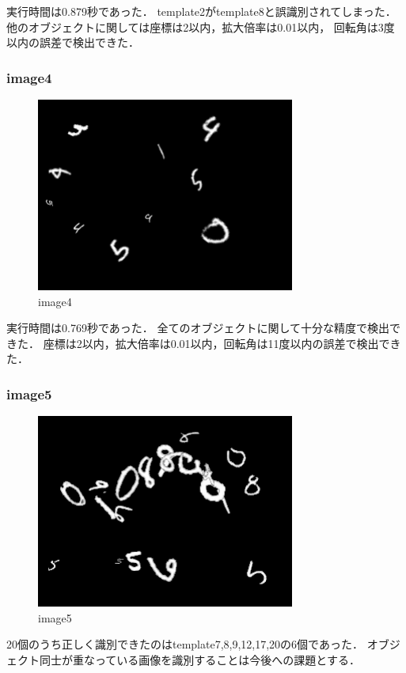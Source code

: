 \documentclass[uplatex,dvipdfmx]{jsarticle}
\begin{document}

\newpage
実行時間は0.879秒であった．
template2がtemplate8と誤識別されてしまった．
他のオブジェクトに関しては座標は2以内，拡大倍率は0.01以内，
回転角は3度以内の誤差で検出できた．


\subsubsection{image4}

\begin{figure}[h]
\centering
\includegraphics[clip,width = 8.5cm]{images/image4.png}
\caption{image4}
\label{graph4}
\end{figure}


\newpage
実行時間は0.769秒であった．
全てのオブジェクトに関して十分な精度で検出できた．
座標は2以内，拡大倍率は0.01以内，回転角は11度以内の誤差で検出できた．


\subsubsection{image5}
\begin{figure}[h]
\centering
\includegraphics[clip,width = 8.5cm]{images/image5.png}
\caption{image5}
\label{graph5}
\end{figure}
20個のうち正しく識別できたのはtemplate7,8,9,12,17,20の6個であった．
オブジェクト同士が重なっている画像を識別することは今後への課題とする．
\end{document}
